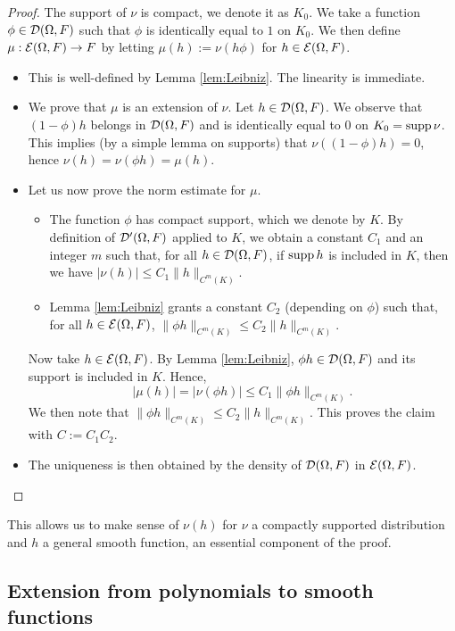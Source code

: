 \begin{proof}
  The support of $\nu$ is compact, we denote it as $K_0$.
  We take a function $\phi \in \testfunc[\Omega,F]$
  such that $\phi$ is identically equal to
  $1$ on $K_0$.
  We then define $\mu : \smooth[\Omega,F] \rightarrow F$
  by letting $\mu(h) := \nu(h \phi)$ for $h \in \smooth[\Omega,F]$.
 \begin{itemize}
  \item  This is well-defined by Lemma \ref{lem:Leibniz}. The linearity is immediate.
  \item We prove that $\mu$ is an extension of $\nu$.
  Let $h \in \testfunc[\Omega,F]$.
  We observe that $(1-\phi) h$ belongs in $\testfunc[\Omega,F]$ and
  is identically equal to $0$ on $K_0 = \supp \nu$.
  This implies (by a simple lemma on supports) that $\nu((1-\phi)h) = 0$,
  hence $\nu(h) = \nu(\phi h) = \mu(h)$.
  \item Let us now prove the norm estimate for $\mu$.
\begin{itemize}
  \item
  The function $\phi$ has compact support, which we denote by $K$.
  By definition of $\distrib[\Omega,F]$ applied to $K$, we obtain a constant $C_1$
  and an integer $m$ such that, for all $h \in \testfunc[\Omega,F]$,
  if $\supp h$ is included in $K$, then
  we have $|\nu(h)| \leq C_1 \|h\|_{C^m(K)}$.
 \item Lemma \ref{lem:Leibniz} grants a constant $C_2$ (depending on $\phi$) such that,
 for all $h \in \smooth[\Omega,F]$,
  $\|\phi h\|_{C^m(K)} \leq C_2 \|h\|_{C^m(K)}$.
\end{itemize}
Now take $h \in \smooth[\Omega,F]$.
By Lemma \ref{lem:Leibniz}, $\phi h \in \testfunc[\Omega,F]$ and its support is included in
$K$. Hence,
\begin{equation*}
  |\mu(h)| = |\nu(\phi h)| \leq C_1 \|\phi h\|_{C^m(K)}.
\end{equation*}
We then note that $\|\phi h\|_{C^m(K)} \leq C_2 \|h\|_{C^m(K)}$.
This proves the claim with $C := C_1 C_2$.
\item  The uniqueness is then obtained by the density of $\testfunc[\Omega,F]$ in $\smooth[\Omega,F]$.
\end{itemize}
\end{proof}

This allows us to make sense of $\nu(h)$ for $\nu$ a compactly supported distribution
and $h$ a general smooth function, an essential component of the proof.

\subsection{Extension from polynomials to smooth functions}

